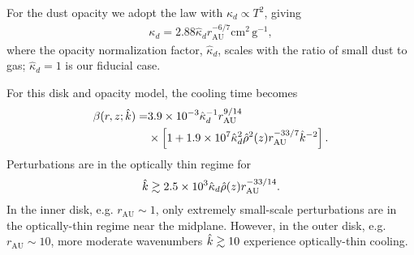 For the dust opacity we adopt the \citet{bell94} law with $\kappa_d
\propto T^2$, giving 
\begin{align}
 \kappa_d %
    =
   2.88\hat{\kappa}_d r_\mathrm{AU}^{-6/7}\mathrm{cm}^2\,\mathrm{g}^{-1},   
\end{align}
where the opacity normalization factor, $\hat{\kappa}_d$, scales with
the ratio of small dust to gas;  $\hat{\kappa}_d = 1$ is our fiducial
case. 


For this disk and opacity model, the cooling time becomes
\begin{align}\label{beta_mmsn_simp}
  \beta(r,z;\hat{k})\notag = &3.9\times10^{-3}\hat{\kappa}_d^{-1}
  r_\mathrm{AU}^{9/14}
  \notag\\ &\times \left[1 +
    1.9\times10^7\hat{\kappa}_d^{2}\hat{\rho}^2(z)r_\mathrm{AU}^{-33/7}\hat{k}^{-2}\right]. 
\end{align}
Perturbations are in the optically thin regime for
\begin{align}
  \hat{k}\gtrsim 2.5\times10^3\hat{\kappa}_d\hat{\rho}(z)r_\mathrm{AU}^{-33/14}.  
\end{align}
In the inner disk, e.g. $r_\mathrm{AU}\sim 1$, only
extremely small-scale perturbations are in the optically-thin
regime near the midplane. However, in the outer disk, e.g. $r_\mathrm{AU}\sim 10$, 
 more moderate wavenumbers $\hat{k}\gtrsim 10$ experience optically-thin cooling.

